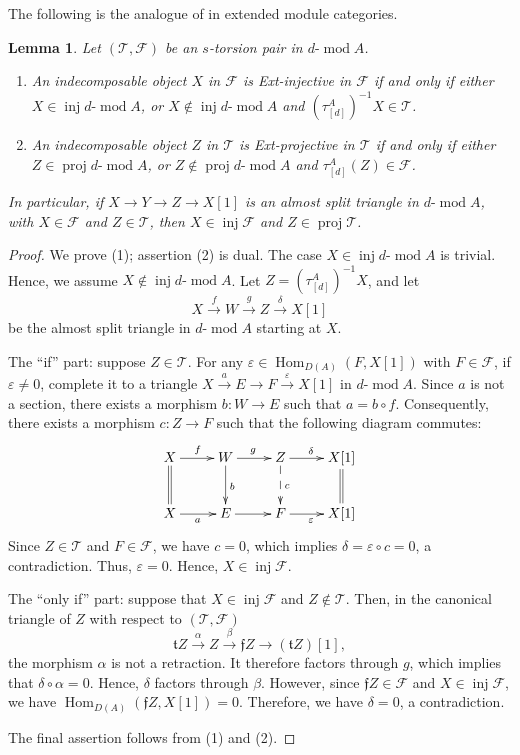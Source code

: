 \documentclass[11pt,a4paper,reqno]{amsart}
\theoremstyle{plain}
\newtheorem{lemma}[theorem]{Lemma}
\numberwithin{equation}{section}
\theoremstyle{definition}
\renewcommand{\mod}{\operatorname{mod}}
\newcommand{\Hom}{\operatorname{Hom}}
\newcommand{\Proj}{\operatorname{proj}}
\newcommand{\Inj}{\operatorname{inj}}
\newcommand{\emod}[2]{#1\text{-}\!\mod #2}
\newcommand{\T}{\mathcal{T}}
\newcommand{\F}{\mathcal{F}}
\begin{document}
The following is the analogue of \cite[Lemma~0.1]{S} in extended module categories.

\begin{lemma}\label{lem:smalo}
Let $(\T,\F)$ be an $s$-torsion pair in
$\emod{d}{A}$.
\begin{enumerate}
\item An indecomposable object $X$ in $\F$ is Ext-injective in $\F$ if and only if either $X\in\Inj\emod{d}{A}$, or $X\notin\Inj\emod{d}{A}$ and $(\tau^A_{[d]})^{-1}X\in\T$.
\item An indecomposable object $Z$ in $\T$ is Ext-projective in $\T$ if and only if either $Z\in\Proj\emod{d}{A}$, or $Z\notin\Proj\emod{d}{A}$ and $\tau^A_{[d]}(Z)\in\F$.
\end{enumerate}
In particular, if $X\to Y\to Z\to X[1]$ is an almost split triangle in $\emod{d}{A}$, with $X\in\F$ and $Z\in\T$, then $X\in\Inj\F$ and $Z\in\Proj\T$.
\end{lemma}

\begin{proof}
We prove (1); assertion (2) is dual. The case $X\in\Inj\emod{d}{A}$ is trivial. Hence, we assume $X\notin\Inj\emod{d}{A}$. Let $Z=(\tau^A_{[d]})^{-1}X$, and let
\[
 X\xrightarrow{f}W\xrightarrow{g} Z \xrightarrow{\delta}X[1]
\]
be the almost split triangle in $\emod{d}{A}$ starting at $X$.

The ``if'' part: suppose $Z\in\T$. For any $\varepsilon\in\Hom_{D(A)}(F,X[1])$ with $F\in\F$, if $\varepsilon\neq 0$, complete it to a triangle $X\xrightarrow{a}E\to F\xrightarrow{\varepsilon}X[1]$ in $\emod{d}{A}$. Since $a$ is not a section, there exists a morphism $b\colon W\to E$ such that $a=b\circ f$. Consequently, there exists a morphism $c\colon Z\to F$ such that the following diagram commutes:
\[\xymatrix{
  X\ar[r]^{f}\ar@{=}[d]&W\ar[r]^{g}\ar[d]^{b}& Z \ar[r]^{\delta}\ar@{-->}[d]^{c}&X[1]\ar@{=}[d]\\
  X\ar[r]_{a}&E\ar[r]&F\ar[r]_{\varepsilon}&X[1]
}\]
Since $Z\in\T$ and $F\in\F$, we have $c=0$, which implies $\delta=\varepsilon\circ c=0$, a contradiction. Thus, $\varepsilon= 0$. Hence,  $X\in\Inj\F$.

The ``only if'' part: suppose that $X\in\Inj\F$ and $Z\notin\T$. Then, in the canonical triangle of $Z$ with respect to $(\T,\F)$
\[
 \mathfrak{t}Z\xrightarrow{\alpha}Z\xrightarrow{\beta}\mathfrak{f}Z
 \to(\mathfrak{t}Z)[1],
\]
the morphism $\alpha$ is not a retraction. It therefore factors through $g$,
which implies that $\delta\circ\alpha=0$. Hence, $\delta$ factors through $\beta$. However, since $\mathfrak{f}Z\in\F$ and $X\in\Inj\F$, we have $\Hom_{D(A)}(\mathfrak{f}Z,X[1])=0$. Therefore, we have $\delta=0$, a contradiction.

The final assertion follows from (1) and (2).
\end{proof}
\end{document}
